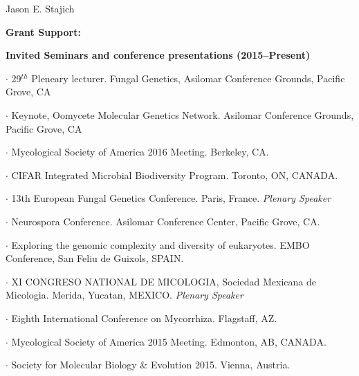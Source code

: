 \documentclass[10pt]{article}
\begin{document}
\begin{cv}{\centerline{Jason E. Stajich}}
\begin{cvlistcompact}{\bf Grant Support:}
\end{cvlistcompact}


\setlength{\cvlabelwidth}{8mm}
\begin{cvlistcompact}{\bf Invited Seminars and conference presentations (2015--Present)}
\item [2017] $\cdot$ 29$^{th}$ Pleneary lecturer. Fungal Genetics,
  Asilomar Conference Grounds, Pacific Grove, CA
  \item $\cdot$ Keynote, Oomycete Molecular Genetics Network. Asilomar Conference Grounds, Pacific Grove, CA
\item [2016] $\cdot$
  Mycological Society of America 2016 Meeting. Berkeley, CA. 
\item $\cdot$
    CIFAR Integrated Microbial Biodiversity Program. Toronto, ON, CANADA.
  \item $\cdot$   %
    13th European Fungal Genetics Conference.
    Paris, France.  {\it Plenary Speaker}
  \item $\cdot$ %
    Neurospora Conference. Asilomar Conference Center, Pacific
    Grove, CA.
\item [2015] $\cdot$ %
  Exploring the genomic complexity and diversity of
  eukaryotes. EMBO Conference, San Feliu de Guixols, SPAIN. 
\item $\cdot$   %
  XI CONGRESO NATIONAL DE MICOLOGIA, Sociedad Mexicana de
  Micologia. Merida, Yucatan, MEXICO. {\it Plenary Speaker}
  \item $\cdot$ %
    Eighth International Conference on Mycorrhiza.
    Flagstaff, AZ. 
  \item $\cdot$ %
    Mycological Society of America 2015 Meeting. Edmonton, AB, CANADA. 
  \item $\cdot$  %
    Society for Molecular Biology \& Evolution 2015. Vienna, Austria.
\end{cvlistcompact}


\end{cv}
\end{document}
